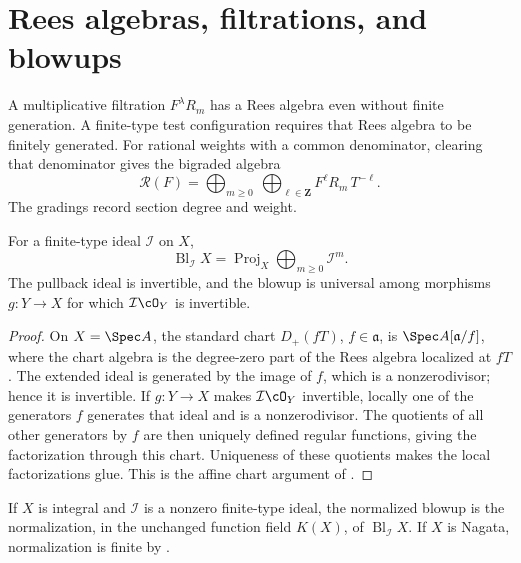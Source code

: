 \section{Rees algebras, filtrations, and blowups}
\label{sec:appA-rees-algebras}

A multiplicative filtration \(F^\lambda R_m\) has a Rees algebra even
without finite generation.  A finite-type test configuration requires that
Rees algebra to be finitely generated.  For rational weights with a common
denominator, clearing that denominator gives the bigraded algebra
\[
 \mathcal R(F)=
 \bigoplus_{m\geq0}\ \bigoplus_{\ell\in\mathbf Z}
 F^\ell R_m\,T^{-\ell}.
\tag{A.3}\label{eq:appA-filtered-rees}
\]
The gradings record section degree and weight.

\begin{proposition}\label{prop:appA-blowup-proj}
For a finite-type ideal \(\mathcal I\) on \(X\),
\[
 \operatorname{Bl}_{\mathcal I}X
   =\operatorname{Proj}_X
       \bigoplus_{m\geq0}\mathcal I^m.
\tag{A.4}\label{eq:appA-blowup-proj}
\]
The pullback ideal is invertible, and the blowup is universal among
morphisms \(g:Y\to X\) for which \(\mathcal I\cO_Y\) is invertible.
\end{proposition}

\begin{proof}
On \(X=\Spec A\), the standard chart \(D_+(fT)\), \(f\in\mathfrak a\), is
\(\Spec A[\mathfrak a/f]\), where the chart algebra is the degree-zero
part of the Rees algebra localized at \(fT\).  The extended ideal is
generated by the image of \(f\), which is a nonzerodivisor; hence it is
invertible.  If \(g:Y\to X\) makes \(\mathcal I\cO_Y\) invertible, locally
one of the generators \(f\) generates that ideal and is a nonzerodivisor.
The quotients of all other generators by \(f\) are then uniquely defined
regular functions, giving the factorization through this chart.  Uniqueness
of these quotients makes the local factorizations glue.  This is the affine
chart argument of
\cite[Lemmas~31.33.4--31.33.6,
\href{https://stacks.math.columbia.edu/tag/01OF}{Tag 01OF}]{stacks-project}.
\end{proof}

\begin{definition}
\label{def:appA-normalized-blowup}
If \(X\) is integral and \(\mathcal I\) is a nonzero finite-type ideal,
the normalized blowup is the normalization, in the
unchanged function field \(K(X)\), of
\(\operatorname{Bl}_{\mathcal I}X\).  If \(X\) is Nagata, normalization is
finite by
\cite[\href{https://stacks.math.columbia.edu/tag/035S}{Tag 035S}]
{stacks-project}.
\end{definition}


